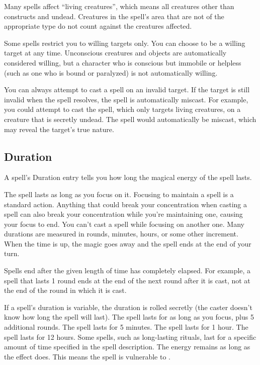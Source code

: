          Many spells affect ``living creatures'', which means all creatures other than constructs and undead. Creatures in the spell's area that are not of the appropriate type do not count against the creatures affected.

         Some spells restrict you to willing targets only. You can choose to be a willing target at any time. Unconscious creatures and objects are automatically considered willing, but a character who is conscious but immobile or helpless (such as one who is bound or paralyzed) is not automatically willing.

         You can always attempt to cast a spell on an invalid target.
        If the target is still invalid when the spell resolves, the spell is automatically miscast.
        For example, you could attempt to cast the  spell, which only targets living creatures, on a creature that is secretly undead.
        The spell would automatically be miscast, which may reveal the target's true nature.

    \subsection{Duration}

        A spell's Duration entry tells you how long the magical energy of the spell lasts.

         The spell lasts as long as you focus on it. Focusing to maintain a spell is a standard action. Anything that could break your concentration when casting a spell can also break your concentration while you're maintaining one, causing your focus to end. You can't cast a spell while focusing on another one.
         Many durations are measured in rounds, minutes, hours, or some other increment. When the time is up, the magic goes away and the spell ends at the end of your turn.

        Spells end after the given length of time has completely elapsed. For example, a spell that lasts 1 round ends at the end of the next round after it is cast, not at the end of the round in which it is cast.

        If a spell's duration is variable, the duration is rolled secretly (the caster doesn't know how long the spell will last).
         The spell lasts for as long as you focus, plus 5 additional rounds.
         The spell lasts for 5 minutes.
         The spell lasts for 1 hour.
         The spell lasts for 12 hours.
         Some spells, such as long-lasting rituals, last for a specific amount of time specified in the spell description.
         The energy remains as long as the effect does. This means the spell is vulnerable to .

